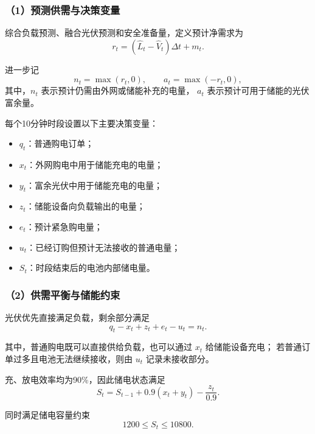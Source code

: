 \subsubsection*{（1）预测供需与决策变量}

综合负载预测、融合光伏预测和安全准备量，定义预计净需求为
\begin{equation}
r_t
=
(\widehat{L}_t-\widehat{V}_t)\Delta t+m_t.
\end{equation}

进一步记
\begin{equation}
n_t=\max(r_t,0),
\qquad
a_t=\max(-r_t,0),
\end{equation}
其中，$n_t$ 表示预计仍需由外网或储能补充的电量，
$a_t$ 表示预计可用于储能的光伏富余量。

每个10分钟时段设置以下主要决策变量：
\begin{itemize}
    \item $q_t$：普通购电订单；
    \item $x_t$：外网购电中用于储能充电的电量；
    \item $y_t$：富余光伏中用于储能充电的电量；
    \item $z_t$：储能设备向负载输出的电量；
    \item $e_t$：预计紧急购电量；
    \item $u_t$：已经订购但预计无法接收的普通电量；
    \item $S_t$：时段结束后的电池内部储电量。
\end{itemize}


\subsubsection*{（2）供需平衡与储能约束}

光伏优先直接满足负载，剩余部分满足
\begin{equation}
q_t-x_t+z_t+e_t-u_t=n_t.
\end{equation}

其中，普通购电既可以直接供给负载，也可以通过 $x_t$ 给储能设备充电；
若普通订单过多且电池无法继续接收，则由 $u_t$ 记录未接收部分。

充、放电效率均为90\%，因此储电状态满足
\begin{equation}
S_t
=
S_{t-1}
+
0.9(x_t+y_t)
-
\frac{z_t}{0.9}.
\end{equation}

同时满足储电容量约束
\begin{equation}
1200\leq S_t\leq10800.
\end{equation}

